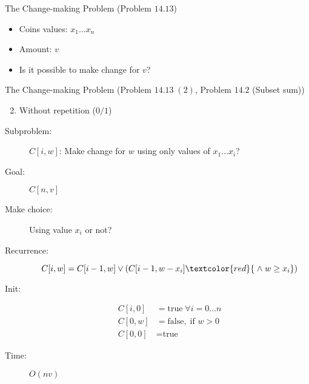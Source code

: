 
\begin{frame}{}
  \centerline{}
\end{frame}

\begin{frame}{}
  \begin{exampleblock}{The Change-making Problem (Problem $14.13$)}
    \begin{itemize}
      \item Coins values: $x_{1} \dots x_{n}$
      \item Amount: $v$
      \item Is it possible to make change for $v$?
    \end{itemize}
  \end{exampleblock}
\end{frame}
\begin{frame}{}
  \begin{exampleblock}{The Change-making Problem (Problem $14.13\; (2)$, Problem $14.2$ (Subset sum))}
    \begin{enumerate}[(1)]
      \setcounter{enumi}{1}
      \item Without repetition ($0/1$)
    \end{enumerate}
  \end{exampleblock}

  \pause
  \begin{description}
    \item[Subproblem:] $C[i, w]$: Make change for $w$ using only values of $x_{1} \dots x_{i}$?
    \item[Goal:] $C[n,v]$
      \pause
    \item[Make choice:] Using value $x_{i}$ or not?
    \item[Recurrence:] 
      \[
	C[i,w] = C[i-1, w] \lor (C[i-1, w-x_{i}] \textcolor{red}{\;\land\; w \ge x_{i}})
      \]
      \pause
    \item[Init:]
      \begin{align*}
	C[i,0] &= \text{true}  \; \forall i = 0 \dots n  \\
	C[0,w] &= \text{false}, \;\text{if } w > 0 \\
	C[0,0] &= \text{true}
      \end{align*}
    \item[Time:] $O(nv)$
  \end{description}
\end{frame}

